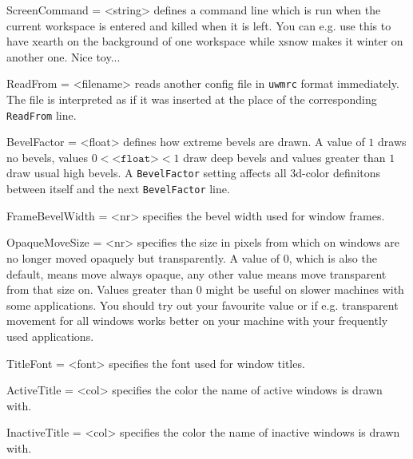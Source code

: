 \documentclass[10pt,a4paper]{article}
\newenvironment{ttdesc}[1]{
   \begin{list}{}{
          \renewcommand{\makelabel}[1]{\texttt{##1\hfill}}}}{\end{list}}
\begin{document}
\begin{ttdesc}{description}
\item[ScreenCommand = <string>] defines a command line which is run when the current workspace is entered and killed when it is left. You can e.g. use this to have xearth on the background of one workspace while xsnow makes it winter on another one. Nice toy...

\item[ReadFrom = <filename>] reads another config file in \texttt{uwmrc} format immediately. The file is interpreted as if it was inserted at the place of the corresponding \texttt{ReadFrom} line.

\item[BevelFactor = <float>] defines how extreme bevels are drawn. A value of $1$ draws no bevels, values $0<\texttt{<float>}<1$ draw deep bevels and values greater than $1$ draw usual high bevels. A \texttt{BevelFactor} setting affects all 3d-color definitons between itself and the next \texttt{BevelFactor} line.

\item[FrameBevelWidth = <nr>] specifies the bevel width used for window frames.

\item[OpaqueMoveSize = <nr>] specifies the size in pixels from which on windows are no longer moved opaquely but transparently. A value of 0, which is also the default, means move always opaque, any other value means move transparent from that size on. Values greater than 0 might be useful on slower machines with some applications. You should try out your favourite value or if e.g. transparent movement for all windows works better on your machine with your frequently used applications.

\item[TitleFont = <font>] specifies the font used for window titles.

\item[ActiveTitle = <col>] specifies the color the name of active windows is drawn with.

\item[InactiveTitle = <col>] specifies the color the name of inactive windows is drawn with.


\end{ttdesc}
\end{document}
